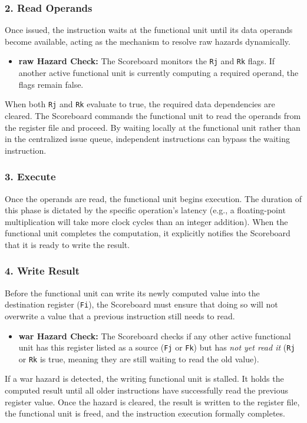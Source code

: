 \subsubsection{2. Read Operands}
Once issued, the instruction waits at the functional unit until its data operands become available, acting as the mechanism to resolve \gls{raw} hazards dynamically.
\begin{itemize}
    \item \textbf{\gls{raw} Hazard Check:} The Scoreboard monitors the \texttt{Rj} and \texttt{Rk} flags. If another active functional unit is currently computing a required operand, the flags remain false.
\end{itemize}
When both \texttt{Rj} and \texttt{Rk} evaluate to true, the required data dependencies are cleared. The Scoreboard commands the functional unit to read the operands from the register file and proceed. By waiting locally at the functional unit rather than in the centralized issue queue, independent instructions can bypass the waiting instruction.

\subsubsection{3. Execute}
Once the operands are read, the functional unit begins execution. The duration of this phase is dictated by the specific operation's latency (e.g., a floating-point multiplication will take more clock cycles than an integer addition). When the functional unit completes the computation, it explicitly notifies the Scoreboard that it is ready to write the result.

\subsubsection{4. Write Result}
Before the functional unit can write its newly computed value into the destination register (\texttt{Fi}), the Scoreboard must ensure that doing so will not overwrite a value that a previous instruction still needs to read. 
\begin{itemize}
    \item \textbf{\gls{war} Hazard Check:} The Scoreboard checks if any other active functional unit has this register listed as a source (\texttt{Fj} or \texttt{Fk}) but has \textit{not yet read it} (\texttt{Rj} or \texttt{Rk} is true, meaning they are still waiting to read the old value).
\end{itemize}
If a \gls{war} hazard is detected, the writing functional unit is stalled. It holds the computed result until all older instructions have successfully read the previous register value. Once the hazard is cleared, the result is written to the register file, the functional unit is freed, and the instruction execution formally completes.

